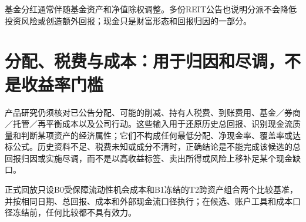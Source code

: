 基金分红通常伴随基金资产和净值除权调整。多份REIT公告也说明分派不会降低投资风险或创造额外回报；现金只是财富形态和回报归因的一部分。

\section{分配、税费与成本：用于归因和尽调，不是收益率门槛}

产品研究仍须核对已公告分配、可能的削减、持有人税费、到账费用、基金／券商／托管／再平衡成本以及公司行动。这些输入用于还原历史总回报、识别现金流质量和判断某项资产的经济属性；它们不构成任何最低分配、净现金率、覆盖率或达标公式。历史资料不足、税费未知或成分不清时，正确结论是不能完成该候选的总回报归因或实施尽调，而不是以高收益标签、卖出所得或风险上移补足某个现金缺口。

正式回放只设B0受保障流动性机会成本和B1冻结的T2跨资产组合两个比较基准，并按相同日期、总回报、成本和外部现金流口径执行；在候选、账户工具和成本口径冻结前，任何比较都不具有效力。
